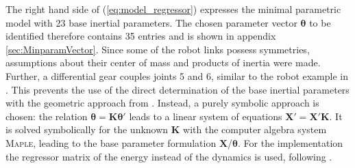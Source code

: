 The right hand side of (\ref{eq:model_regressor}) expresses the minimal parametric model with 23 base inertial parameters.
The chosen parameter vector $\boldsymbol{\theta}$ to be identified therefore contains 35 entries and is shown in appendix \ref{sec:MinparamVector}.
%
Since some of the robot links possess symmetries, assumptions about their center of mass and products of inertia were made.
Further, a differential gear couples joints 5 and 6, similar to the robot example in \cite{M.Gautier.1995}.
This prevents the use of the direct determination of the base inertial parameters with the geometric approach from \cite{Khalil.2006}.
Instead, a purely symbolic approach is chosen: the relation $\boldsymbol{\theta}=\boldsymbol{K} \boldsymbol{\theta}'$ leads to a linear system of equations $\boldsymbol{X}' = \boldsymbol{X}'\boldsymbol{K}$.
It is solved symbolically for the unknown $\boldsymbol{K}$ with the computer algebra system \textsc{Maple}, leading to the base parameter formulation $\boldsymbol{X}$/$\boldsymbol{\theta}$.
For the implementation the regressor matrix of the energy instead of the dynamics is used, following \cite{M.Gautier.1995, Khalil.2006}.

